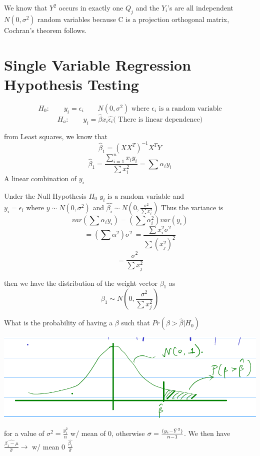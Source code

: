 We know that $Y^2$ occurs in exactly one $Q_j$ and the $Y_i$'s are all independent $N(0,\sigma^2)$ random variables because C is a projection orthogonal matrix, Cochran's theorem follows.


\section{Single Variable Regression Hypothesis Testing}
\[
H_0: \qquad y_i =\epsilon_i \qquad N(0,\sigma^2) \textrm{ where $\epsilon_i$ is a random variable}
\]
\[
H_a: \qquad y_i =\hat{\beta}x_i \hat{\epsilon_i} \textrm{( There is linear dependence)}
\]

from Least squares, we know that 
\[
\hat{\beta}_1 = (XX^T)^{-1}X^TY 
\]
\[
\hat{\beta}_1 = \frac{\sum_{i=1}^n x_i y_i}{\sum x_i^2} =\sum \alpha_i y_i
\]
A  linear combination of  $y_i$

Under the Null Hypothesis $H_0$
$y_i \textrm{ is a random variable}$ 
 and $y_i = \epsilon_i \textrm{ where }y\sim N(0,\sigma^2)$ and $\hat{\beta_i}\sim N(0,\frac{\sigma^2}{\sum x_i^2})$
 Thus the variance is
\[var(\sum \alpha_iy_i) = (\sum \alpha_i^2) var(y_i)\]
\[=(\sum \alpha^2) \sigma^2\ = \frac{\sum x_i^2 \sigma^2}{\sum(x_j^2)^2} \]
\[=\frac{\sigma^2}{\sum x_j^2}\]

then we have the distribution of the weight vector $\beta_1$ as 
\[ \beta_1 \sim N(0,\frac{\sigma^2}{\sum x_j^2}) \]

What is the probability of having a $\beta$ such that $Pr(\beta >\hat{\beta}|H_0)$ 

\begin{center}
    \includegraphics{Images/BetaProb.png}
\end{center}
for a value of $\sigma^2= \frac{y_i^2}{n}$ w/ mean of 0, otherwise $\sigma = \frac{(y_i - \Bar{Y}^2)}{n-1}$. We then have $\frac{\hat{\beta_1 -\mu}}{\hat{\sigma}}\to$ w/ mean 0 $\frac{\hat{\beta_1}}{\hat{\sigma}}$ \\

